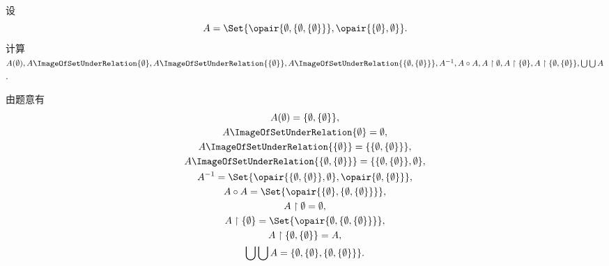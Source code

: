 \begin{example}
设\[
	A = \Set{
		\opair{\emptyset,\{\emptyset,\{\emptyset\}\}},
		\opair{\{\emptyset\},\emptyset}
	}.
\]
计算\(A(\emptyset),
A\ImageOfSetUnderRelation{\emptyset},
A\ImageOfSetUnderRelation{\{\emptyset\}},
A\ImageOfSetUnderRelation{\{\emptyset,\{\emptyset\}\}},
A^{-1},
A \circ A,
A \SetRestrict \emptyset,
A \SetRestrict \{\emptyset\},
A \SetRestrict \{\emptyset,\{\emptyset\}\},
\bigcup\bigcup A\).
\begin{solution}
由题意有\begin{gather*}
	A(\emptyset)
	= \{\emptyset,\{\emptyset\}\}, \\
	A\ImageOfSetUnderRelation{\emptyset}
	= \emptyset, \\
	A\ImageOfSetUnderRelation{\{\emptyset\}}
	= \{\{\emptyset,\{\emptyset\}\}\}, \\
	A\ImageOfSetUnderRelation{\{\emptyset,\{\emptyset\}\}}
	= \{\{\emptyset,\{\emptyset\}\},\emptyset\}, \\
	A^{-1}
	= \Set{
		\opair{\{\emptyset,\{\emptyset\}\},\emptyset},
		\opair{\emptyset,\{\emptyset\}}
	}, \\
	A \circ A
	= \Set{
		\opair{\{\emptyset\},\{\emptyset,\{\emptyset\}\}}
	}, \\
	A \SetRestrict \emptyset
	= \emptyset, \\
	A \SetRestrict \{\emptyset\}
	= \Set{
		\opair{\emptyset,\{\emptyset,\{\emptyset\}\}}
	}, \\
	A \SetRestrict \{\emptyset,\{\emptyset\}\}
	= A, \\
	\bigcup\bigcup A
	= \{
		\emptyset,
		\{\emptyset\},
		\{\emptyset,\{\emptyset\}\}
	\}.
\end{gather*}
\end{solution}
\end{example}

